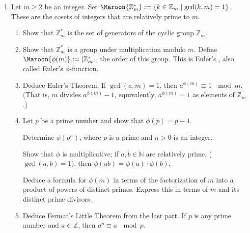 \documentclass[12pt]{article}
\newcommand{\NN}{{\mathbb N}}
\newcommand{\ZZ}{{\mathbb Z}}
\def\demph#1{\Maroon{{\sl #1}}}
\def\defcolor#1{\Maroon{#1}}
\begin{document}
\begin{enumerate}
\item     
   Let $m\geq 2$ be an integer.
   Set $\defcolor{\ZZ^*_m}:=\{ k\in \ZZ_m \mid \gcd(k,m)=1\}$.
    These are the cosets of integers that are relatively prime to $m$.
  \begin{enumerate}

   \item  Show that $\ZZ^*_m$ is the set of generators of the cyclic group $\ZZ_m$.
      \vspace{-2pt}

   \item  Show that $\ZZ^*_m$ is a group under multiplication modulo $m$.
         Define $\defcolor{\phi(m)}:=|\ZZ^*_m|$, the order of this group.
          This is Euler's \demph{totient function}, also called Euler's $\phi$-function.\vspace{-2pt}

   \item  Deduce Euler's Theorem.
          If $\gcd(a,m)=1$, then $a^{\phi(m)} \equiv 1\ \mod m$. \newline
           (That is, $m$ divides $a^{\phi(m)} -1$, equivalently, $a^{\phi(m)}=1$ as elements of $\ZZ_m$.)
            \vspace{-2pt}

   \item  Let $p$ be a prime number and show that $\phi(p)=p-1$.
         
          Determine $\phi(p^n)$, where $p$ is a prime and $n>0$ is an integer.

          Show that $\phi$ is multiplicative; if $a,b\in\NN$ are relatively prime, ($\gcd(a,b)=1$), then 
           $\phi(ab)=\phi(a)\cdot\phi(b)$.

          Deduce a formula for $\phi(m)$ in terms of the factorization of $m$ into a product of powers of distinct
          primes.
          Express this in terms of $m$ and its distinct prime divisors.
      \vspace{-2pt}

   \item   Deduce  Fermat's Little Theorem from the last part.
           If $p$ is any prime number and $a\in\ZZ$, then $a^p\equiv a\ \mod p$.
         
\end{enumerate}

      
\end{enumerate}
\end{document}
